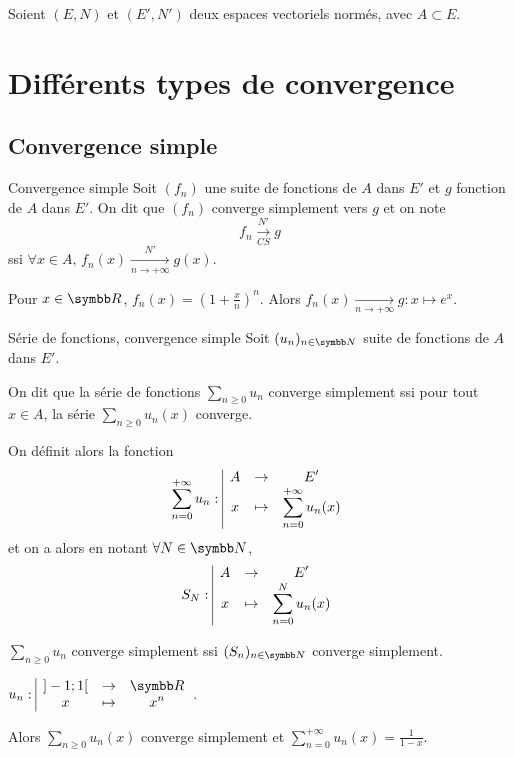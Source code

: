 Soient $(E, N)$ et $(E', N')$ deux espaces vectoriels normés, avec 
$A \subset E$.

\section{Différents types de convergence}
\subsection{Convergence simple }

\begin{definition}{Convergence simple}{}
    Soit $(f_n)$ une suite de fonctions de $A$ dans $E'$ et $g$ fonction de $A$ dans $E'$. 
    On dit que $(f_n)$ converge simplement vers $g$ et on note 
    \[
        f_n \xrightarrow[CS]{N'} g 
    \]
    ssi $\forall x \in A, \, f_n(x) \xrightarrow[n\to +\infty]{N'} g(x)$.
\end{definition}

\begin{exemple}
    Pour $x \in \R$, $f_n(x) = \left( 1 + \frac x n \right)^n$.
    Alors $f_n(x) \xrightarrow[n\to +\infty]{} g : x \mapsto e^x$.
\end{exemple}

\begin{definition}{Série de fonctions, convergence simple}{}
    Soit $(u_n)_{n \in \N}$ suite de fonctions de $A$ dans $E'$.

    On dit que la série de fonctions $\displaystyle \sum_{n \geqslant 0} u_n$ converge simplement 
    ssi pour tout $x \in A$, la série $\displaystyle \sum_{n \geqslant 0} u_n(x)$ converge.

    On définit alors la fonction 
    \[
        \sum_{n = 0 }^{ + \infty } u_n : \space \begin{array}{|ccc} \displaystyle A & \to & \displaystyle E' \\ \displaystyle x & \mapsto & \displaystyle \sum_{n = 0}^{ + \infty } u_n(x) \end{array}
    \]
    et on a alors en notant $\forall N \in \N$, $$S_N: \space \begin{array}{|ccc} \displaystyle A & \to & \displaystyle E' \\ \displaystyle x & \mapsto & \displaystyle \sum_{n = 0}^N u_n(x) \end{array}$$

    $\displaystyle \sum_{n \geqslant 0} u_n$ converge simplement ssi $(S_n)_{n \in \N}$ converge simplement.

\end{definition}

\begin{exemple}
    $\displaystyle \fonction{u_n}{]-1; 1[}{\R}{x}{x^n}$.

    Alors $\displaystyle \sum_{n \geqslant 0} u_n(x)$ converge simplement et $\displaystyle \sum_{n = 0}^{ + \infty } u_n(x) = \frac{1}{1-x}$.
\end{exemple}



